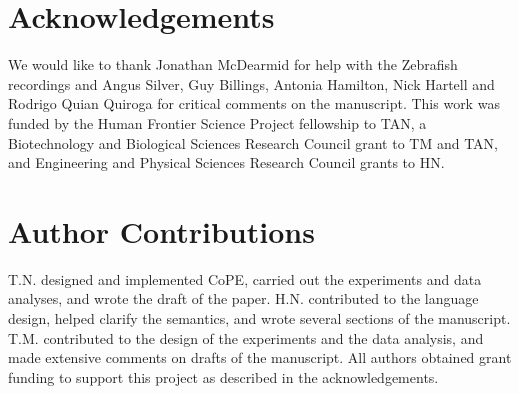 \section*{Acknowledgements} 

We would like to thank Jonathan McDearmid for help with the Zebrafish
recordings and Angus Silver, Guy Billings, Antonia Hamilton, Nick
Hartell and Rodrigo Quian Quiroga for critical comments on the
manuscript. This work was funded by the Human Frontier Science Project
fellowship to TAN, a Biotechnology and Biological Sciences Research
Council grant to TM and TAN, and Engineering and Physical Sciences Research
Council grants to HN.

\section*{Author Contributions}  
T.N. designed and implemented CoPE, carried out the experiments and
data analyses, and wrote the draft of the paper. H.N. contributed to
the language design, helped clarify the semantics, and wrote several
sections of the manuscript. T.M. contributed to the design of the
experiments and the data analysis, and made extensive comments on
drafts of the manuscript. All authors obtained grant funding to
support this project as described in the acknowledgements.


